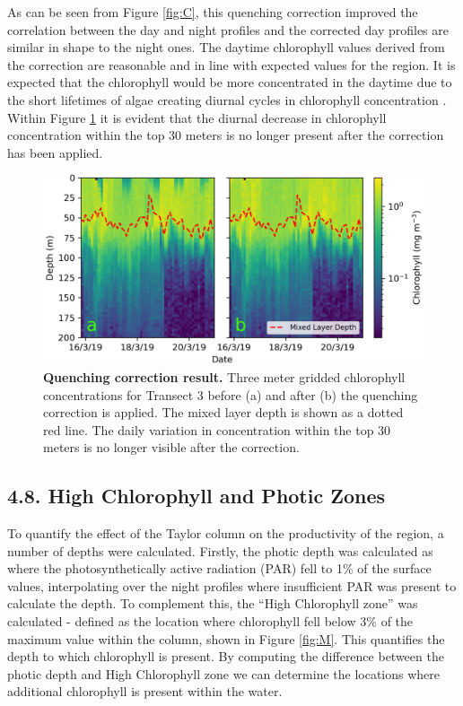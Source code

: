 \documentclass[
	a4paper, %
	10pt, %
	unnumberedsections, %
	twoside, %
]{LTJournalArticle}
\begin{document}
\begin{multicols}{2}
As can be seen from Figure \ref{fig:C}, this quenching correction improved the correlation between the day and night profiles and the corrected
day profiles are similar in shape to the night ones. The daytime chlorophyll values derived from the correction are reasonable and in line with
expected values for the region. It is expected that the chlorophyll would be more concentrated in the daytime due to the short lifetimes of
algae creating diurnal cycles in chlorophyll concentration \citep{ref57}. Within Figure \ref{fig:H} it is evident that the diurnal decrease in
chlorophyll concentration within the top 30 meters is no longer present after the correction has been applied.
\begin{figure}[H] 
	\includegraphics[width=\linewidth]{Louis/figures/figureH.png}
	\caption{\textbf{Quenching correction result.} Three meter gridded chlorophyll concentrations for Transect 3 before (a) and after (b) the quenching correction is applied. The mixed layer depth is shown as a dotted red line. The daily variation in concentration within the top 30 meters is no longer visible after the correction.}
	\label{fig:H}
\end{figure}
 

\subsection{4.8. High Chlorophyll and Photic Zones}

To quantify the effect of the Taylor column on the productivity of the region, a number of depths were calculated. Firstly, the photic depth
was calculated as where the photosynthetically active radiation (PAR) fell to 1\% of the surface values, interpolating over the night profiles
where insufficient PAR was present to calculate the depth. To complement this, the “High Chlorophyll zone” was calculated - defined as the
location where chlorophyll fell below 3\% of the maximum value within the column, shown in Figure \ref{fig:M}. This quantifies the depth to
which chlorophyll is present. By computing the difference between the photic depth and High Chlorophyll zone we can determine the locations
where additional chlorophyll is present within the water.



\end{multicols}
\end{document}
